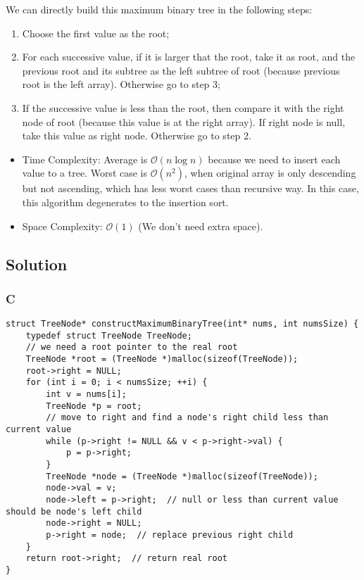 We can directly build this maximum binary tree in the following steps:
\begin{enumerate}
	\item Choose the first value as the root;
	\item For each successive value, if it is larger that the root, take it as root, and the previous root and its subtree as the left subtree of root (because previous root is the left array). Otherwise go to step 3;
	\item If the successive value is less than the root, then compare it with the right node of root (because this value is at the right array). If right node is null, take this value as right node. Otherwise go to step 2.
\end{enumerate}
\begin{itemize}
\item Time Complexity: Average is $\mathcal{O}(n{\log}{n})$ because we need to insert each value to a tree. Worst case is $\mathcal{O}(n^2)$, when original array is only descending but not ascending, which has less worst cases than recursive way. In this case, this algorithm degenerates to the insertion sort.
\item Space Complexity: $\mathcal{O}(1)$ (We don't need extra space).
\end{itemize}

\subsection*{Solution}
\subsubsection*{C}
\begin{verbatim}
struct TreeNode* constructMaximumBinaryTree(int* nums, int numsSize) {
    typedef struct TreeNode TreeNode;
    // we need a root pointer to the real root
    TreeNode *root = (TreeNode *)malloc(sizeof(TreeNode));
    root->right = NULL;
    for (int i = 0; i < numsSize; ++i) {
        int v = nums[i];
        TreeNode *p = root;
        // move to right and find a node's right child less than current value
        while (p->right != NULL && v < p->right->val) {
            p = p->right;
        }
        TreeNode *node = (TreeNode *)malloc(sizeof(TreeNode));
        node->val = v;
        node->left = p->right;  // null or less than current value should be node's left child
        node->right = NULL;
        p->right = node;  // replace previous right child
    }
    return root->right;  // return real root
}
\end{verbatim}

\newpage

